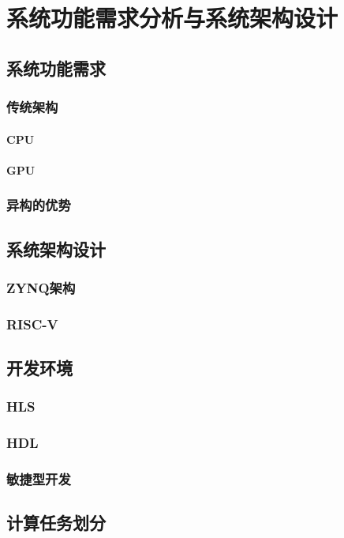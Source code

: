 \chapter{系统功能需求分析与系统架构设计}

\section{系统功能需求}
    \subsection{传统架构}
        \subsubsection{CPU}
        \subsubsection{GPU}
    \subsection{异构的优势}

\section{系统架构设计}
    \subsection{ZYNQ架构}
    \subsection{RISC-V}

\section{开发环境}
    \subsection{HLS}
    \subsection{HDL}
    \subsection{敏捷型开发}

\section{计算任务划分}

